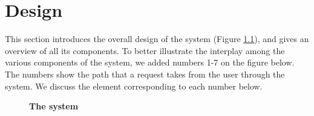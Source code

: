 \chapter{Design}\label{chapter-3}
This section introduces the overall design of the \Project system (Figure \ref{fig:main-design-figure}), and gives an overview of all its components. To better illustrate the interplay among the various components of the system, we added numbers 1-7 on the figure below. The numbers show the path that a request takes from the user through the system. We discuss the element corresponding to each number below.

\begin{figure}[H]
    \centering
    \caption{\textbf{The \Project system}}
    \label{fig:main-design-figure}
\end{figure}

